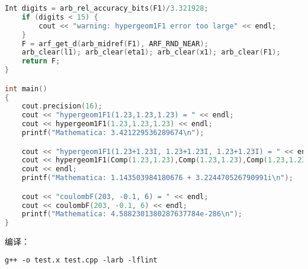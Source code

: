 \begin{lstlisting}[language=cpp, caption=test.cpp]
	Int digits = arb_rel_accuracy_bits(F1)/3.321928;
	if (digits < 15) {
		cout << "warning: hypergeom1F1 error too large" << endl;
	}
	F = arf_get_d(arb_midref(F1), ARF_RND_NEAR);
	arb_clear(l1); arb_clear(eta1); arb_clear(x1); arb_clear(F1);
	return F;
}

int main()
{
	cout.precision(16);
    cout << "hypergeom1F1(1.23,1.23,1.23) = " << endl;
	cout << hypergeom1F1(1.23,1.23,1.23) << endl;
	printf("Mathematica: 3.421229536289674\n");

	cout << "hypergeom1F1(1.23+1.23I, 1.23+1.23I, 1.23+1.23I) = " << endl;
	cout << hypergeom1F1(Comp(1.23,1.23),Comp(1.23,1.23),Comp(1.23,1.23))
    cout << endl;
	printf("Mathematica: 1.143503984180676 + 3.224470526790991i\n");

	cout << "coulombF(203, -0.1, 6) = " << endl;
	cout << coulombF(203, -0.1, 6) << endl;
	printf("Mathematica: 4.5882301380287637784e-286\n");
}
\end{lstlisting}
编译：
\begin{lstlisting}[language=makefile]
g++ -o test.x test.cpp -larb -lflint
\end{lstlisting}
